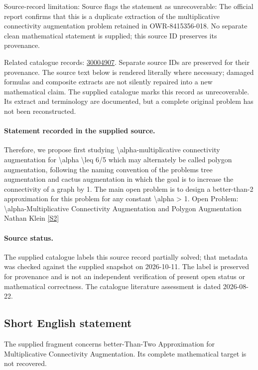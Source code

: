 \documentclass[11pt]{article}
\begin{document}
Source-record limitation: Source flags the statement as unrecoverable: The official report confirms that this is a duplicate extraction of the multiplicative connectivity augmentation problem retained in OWR-8415356-018. No separate clean mathematical statement is supplied; this source ID preserves its provenance.

Related catalogue records: \href{https://mehmetmars7.github.io/Erdosproblems-llm-hunter/problem.html?type=open_problems&id=30004907}{30004907}. Separate source IDs are preserved for their provenance.
The source text below is rendered literally where necessary; damaged formulas and composite extracts are not silently repaired into a new mathematical claim.
The supplied catalogue marks this record as unrecoverable. Its extract and terminology are documented, but a complete original problem has not been reconstructed.
\paragraph{Statement recorded in the supplied source.}
Therefore, we propose first studying \textbackslash{}alpha-multiplicative connectivity augmentation for \textbackslash{}alpha \textbackslash{}leq 6/5 which may alternately be called polygon augmentation, following the naming convention of the problems tree augmentation and cactus augmentation in which the goal is to increase the connectivity of a graph by 1. The main open problem is to design a better-than-2 approximation for this problem for any constant \textbackslash{}alpha > 1. Open Problem: \textbackslash{}alpha-Multiplicative Connectivity Augmentation and Polygon Augmentation Nathan Klein \href{https://doi.org/10.4171/owr/2021/53}{[S2]}
\paragraph{Source status.}
The supplied catalogue labels this source record partially solved; that metadata was checked against the supplied snapshot on 2026-10-11. The label is preserved for provenance and is not an independent verification of present open status or mathematical correctness. The catalogue literature assessment is dated 2026-08-22.
\subsection{Short English statement}
The supplied fragment concerns better-Than-Two Approximation for Multiplicative Connectivity Augmentation. Its complete mathematical target is not recovered.
\end{document}
